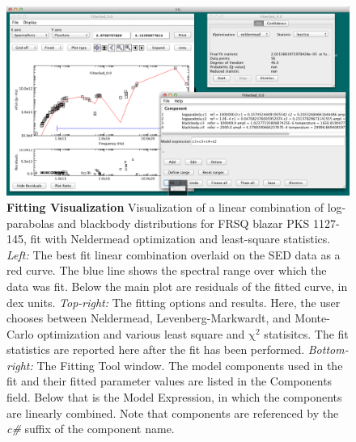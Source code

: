 \documentclass[5p]{elsarticle}
\begin{document}
\begin{figure}
\begin{center}
\includegraphics[width=\columnwidth]{figures/fitting-1.png}
\caption{\textbf{\label{fig:fitting1} Fitting Visualization} Visualization of a linear combination of log-parabolas and blackbody distributions for FRSQ blazar PKS 1127-145, fit with Neldermead optimization and least-square statistics. \textit{Left:} The best fit linear combination overlaid on the SED data as a red curve. The blue line shows the spectral range over which the data was fit. Below the main plot are residuals of the fitted curve, in dex units. \textit{Top-right:} The fitting options and results. Here, the user chooses between Neldermead, Levenberg-Markwardt, and Monte-Carlo optimization and various least square and $\mathrm{\chi}^{2}$ statisitcs. The fit statistics are reported here after the fit has been performed. \textit{Bottom-right:} The Fitting Tool window. The model components used in the fit and their fitted parameter values are listed in the Components field. Below that is the Model Expression, in which the components are linearly combined. Note that components are referenced by the \textit{c\#} suffix of the component name.}
\end{center}
\end{figure}
\end{document}

